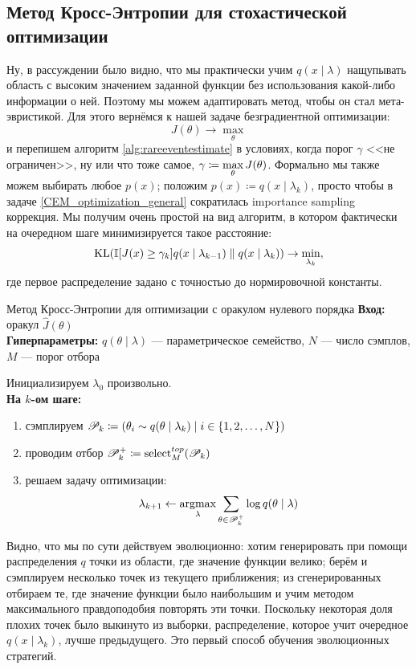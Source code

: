 \subsection{Метод Кросс-Энтропии для стохастической оптимизации}

Ну, в рассуждении было видно, что мы практически учим $q(x \mid \lambda)$ нащупывать область с высоким значением заданной функции без использования какой-либо информации о ней. Поэтому мы можем адаптировать метод, чтобы он стал мета-эвристикой. Для этого вернёмся к нашей задаче безградиентной оптимизации:
$$J(\theta) \to \max_{\theta}$$
и перепишем алгоритм \ref{alg:rareeventestimate} в условиях, когда порог $\gamma$ <<не ограничен>>, ну или что тоже самое, $\gamma \HM\coloneqq \max\limits_{\theta} J(\theta)$. Формально мы также можем выбирать любое $p(x)$; положим $p(x) \coloneqq q(x \mid \lambda_k)$, просто чтобы в задаче \eqref{CEM_optimization_general} сократилась importance sampling коррекция. Мы получим очень простой на вид алгоритм, в котором фактически на очередном шаге минимизируется такое расстояние:
$$\operatorname{KL}(\mathbb{I}[J(x) \ge \gamma_k] q(x \mid \lambda_{k-1}) \parallel q(x \mid \lambda_k)) \to \min_{\lambda_k},$$
где первое распределение задано с точностью до нормировочной константы.

\begin{algorithm}{Метод Кросс-Энтропии для оптимизации с оракулом нулевого порядка}
\textbf{Вход:} оракул $\hat{J}(\theta)$ \\
\textbf{Гиперпараметры:} $q(\theta \mid \lambda)$ --- параметрическое семейство, $N$ --- число сэмплов, $M$ --- порог отбора

\vspace{0.3cm}
Инициализируем $\lambda_0$ произвольно. \\
\textbf{На $k$-ом шаге:}
\begin{enumerate}
    \item сэмплируем $\mathscr{P}_k \coloneqq \left( \theta_i \sim q(\theta \mid \lambda_k) \mid i \in \{1, 2, \dots, N\} \right)$
    \item проводим отбор $\mathscr{P}^{+}_k \coloneqq \mathrm{select}^{\mathop{top}}_M(\mathscr{P}_k)$
    \item решаем задачу оптимизации:
    $$\lambda_{k+1} \leftarrow \mathop{\mathrm{argmax}}_{\lambda} \sum_{\theta \in \mathscr{P}^{+}_k} \log q(\theta \mid \lambda)$$
\end{enumerate}
\end{algorithm}

Видно, что мы по сути действуем эволюционно: хотим генерировать при помощи распределения $q$ точки из области, где значение функции велико; берём и сэмплируем несколько точек из текущего приближения; из сгенерированных отбираем те, где значение функции было наибольшим и учим методом максимального правдоподобия повторять эти точки. Поскольку некоторая доля плохих точек было выкинуто из выборки, распределение, которое учит очередное $q(x \mid \lambda_k)$, лучше предыдущего. Это первый способ обучения эволюционных стратегий.

